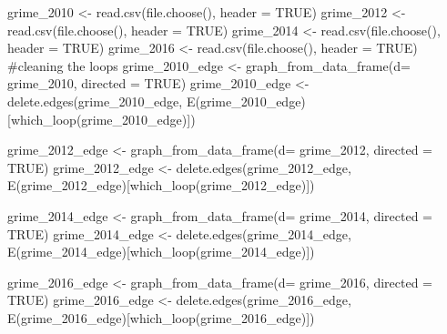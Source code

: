 \documentclass[
  letterpaper,
  DIV=11,
  numbers=noendperiod]{scrreprt}
\newenvironment{Shaded}{\begin{snugshade}}{\end{snugshade}}
\newcommand{\AttributeTok}[1]{\textcolor[rgb]{0.40,0.45,0.13}{#1}}
\newcommand{\CommentTok}[1]{\textcolor[rgb]{0.37,0.37,0.37}{#1}}
\newcommand{\ConstantTok}[1]{\textcolor[rgb]{0.56,0.35,0.01}{#1}}
\newcommand{\FunctionTok}[1]{\textcolor[rgb]{0.28,0.35,0.67}{#1}}
\newcommand{\NormalTok}[1]{\textcolor[rgb]{0.00,0.23,0.31}{#1}}
\newcommand{\OtherTok}[1]{\textcolor[rgb]{0.00,0.23,0.31}{#1}}
\begin{document}
\begin{Shaded}
\begin{Highlighting}[]
\NormalTok{grime\_2010 }\OtherTok{\textless{}{-}} \FunctionTok{read.csv}\NormalTok{(}\FunctionTok{file.choose}\NormalTok{(), }\AttributeTok{header =} \ConstantTok{TRUE}\NormalTok{)}
\NormalTok{grime\_2012 }\OtherTok{\textless{}{-}} \FunctionTok{read.csv}\NormalTok{(}\FunctionTok{file.choose}\NormalTok{(), }\AttributeTok{header =} \ConstantTok{TRUE}\NormalTok{)}
\NormalTok{grime\_2014 }\OtherTok{\textless{}{-}} \FunctionTok{read.csv}\NormalTok{(}\FunctionTok{file.choose}\NormalTok{(), }\AttributeTok{header =} \ConstantTok{TRUE}\NormalTok{)}
\NormalTok{grime\_2016 }\OtherTok{\textless{}{-}} \FunctionTok{read.csv}\NormalTok{(}\FunctionTok{file.choose}\NormalTok{(), }\AttributeTok{header =} \ConstantTok{TRUE}\NormalTok{)}
\CommentTok{\#cleaning the loops}
\NormalTok{grime\_2010\_edge }\OtherTok{\textless{}{-}} \FunctionTok{graph\_from\_data\_frame}\NormalTok{(}\AttributeTok{d=}\NormalTok{ grime\_2010, }\AttributeTok{directed =} \ConstantTok{TRUE}\NormalTok{)}
\NormalTok{grime\_2010\_edge }\OtherTok{\textless{}{-}} \FunctionTok{delete.edges}\NormalTok{(grime\_2010\_edge, }\FunctionTok{E}\NormalTok{(grime\_2010\_edge)[}\FunctionTok{which\_loop}\NormalTok{(grime\_2010\_edge)])}

\NormalTok{grime\_2012\_edge }\OtherTok{\textless{}{-}} \FunctionTok{graph\_from\_data\_frame}\NormalTok{(}\AttributeTok{d=}\NormalTok{ grime\_2012, }\AttributeTok{directed =} \ConstantTok{TRUE}\NormalTok{)}
\NormalTok{grime\_2012\_edge }\OtherTok{\textless{}{-}} \FunctionTok{delete.edges}\NormalTok{(grime\_2012\_edge, }\FunctionTok{E}\NormalTok{(grime\_2012\_edge)[}\FunctionTok{which\_loop}\NormalTok{(grime\_2012\_edge)])}

\NormalTok{grime\_2014\_edge }\OtherTok{\textless{}{-}} \FunctionTok{graph\_from\_data\_frame}\NormalTok{(}\AttributeTok{d=}\NormalTok{ grime\_2014, }\AttributeTok{directed =} \ConstantTok{TRUE}\NormalTok{)}
\NormalTok{grime\_2014\_edge }\OtherTok{\textless{}{-}} \FunctionTok{delete.edges}\NormalTok{(grime\_2014\_edge, }\FunctionTok{E}\NormalTok{(grime\_2014\_edge)[}\FunctionTok{which\_loop}\NormalTok{(grime\_2014\_edge)])}

\NormalTok{grime\_2016\_edge }\OtherTok{\textless{}{-}} \FunctionTok{graph\_from\_data\_frame}\NormalTok{(}\AttributeTok{d=}\NormalTok{ grime\_2016, }\AttributeTok{directed =} \ConstantTok{TRUE}\NormalTok{)}
\NormalTok{grime\_2016\_edge }\OtherTok{\textless{}{-}} \FunctionTok{delete.edges}\NormalTok{(grime\_2016\_edge, }\FunctionTok{E}\NormalTok{(grime\_2016\_edge)[}\FunctionTok{which\_loop}\NormalTok{(grime\_2016\_edge)])}
\end{Highlighting}
\end{Shaded}
\end{document}
